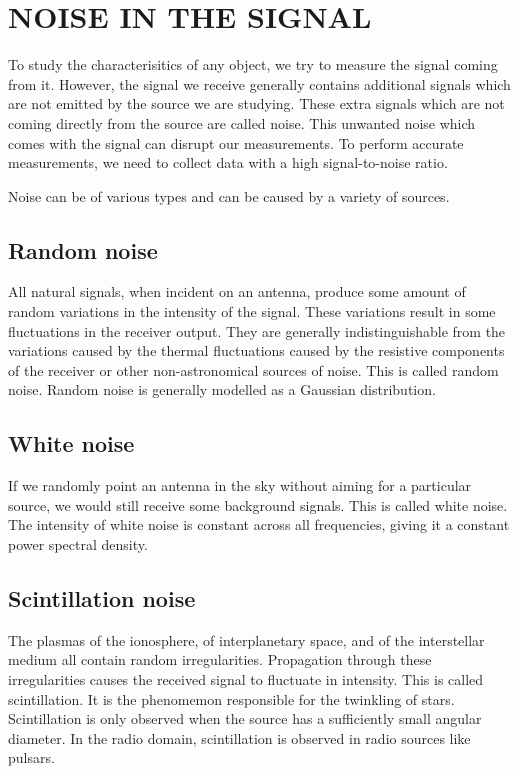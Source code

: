 \documentclass{article_saj}
\begin{document}
\section{NOISE IN THE SIGNAL}
To study the characterisitics of any object, we try to measure the signal coming from it. However, the signal we receive generally contains additional signals which are not emitted by the source we are studying. These extra signals which are not coming directly from the source are called noise. This unwanted noise which comes with the signal can disrupt our measurements. To perform accurate measurements, we need to collect data with a high signal-to-noise ratio.

Noise can be of various types and can be caused by a variety of sources.

\subsection{Random noise}
All natural signals, when incident on an antenna, produce some amount of random variations in the intensity of the signal. These variations result in some fluctuations in the receiver output. They are generally indistinguishable from the variations caused by the thermal fluctuations caused by the resistive components of the receiver or other non-astronomical sources of noise. This is called random noise. Random noise is generally modelled as a Gaussian distribution.

\subsection{White noise}
If we randomly point an antenna in the sky without aiming for a particular source, we would still receive some background signals. This is called white noise. The intensity of white noise is constant across all frequencies, giving it a constant power spectral density.

\subsection{Scintillation noise}
The plasmas of the ionosphere, of interplanetary space, and of the interstellar medium all contain random irregularities. Propagation through these irregularities causes the received signal to fluctuate in intensity. This is called scintillation. It is the phenomemon responsible for the twinkling of stars. Scintillation is only observed when the source has a sufficiently small angular diameter. In the radio domain, scintillation is observed in radio sources like pulsars.
\end{document}
